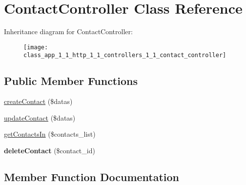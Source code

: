 \hypertarget{class_app_1_1_http_1_1_controllers_1_1_contact_controller}{}\section{Contact\+Controller Class Reference}
\label{class_app_1_1_http_1_1_controllers_1_1_contact_controller}
Inheritance diagram for Contact\+Controller\+:\begin{figure}[H]
\begin{center}
\leavevmode
\texttt{[image: class\_app\_1\_1\_http\_1\_1\_controllers\_1\_1\_contact\_controller]}
\end{center}
\end{figure}
\subsection*{Public Member Functions}
\begin{DoxyCompactItemize}
\item 
\mbox{\hyperlink{class_app_1_1_http_1_1_controllers_1_1_contact_controller_a9c1a9d0c5189af1ee7e9287b1cde286a}{create\+Contact}} (\$datas)
\item 
\mbox{\hyperlink{class_app_1_1_http_1_1_controllers_1_1_contact_controller_a130677ffbe99afed089649cbaf087a96}{update\+Contact}} (\$datas)
\item 
\mbox{\hyperlink{class_app_1_1_http_1_1_controllers_1_1_contact_controller_aa1e18fa592ca6af9570bafcb7ed25dd6}{get\+Contacts\+In}} (\$contacts\+\_\+list)
\item 
\mbox{\label{class_app_1_1_http_1_1_controllers_1_1_contact_controller_a68700d3146da40f57153f6ac05d5d2ac}} 
{\bfseries delete\+Contact} (\$contact\+\_\+id)
\end{DoxyCompactItemize}


\subsection{Member Function Documentation}
\mbox{\label{class_app_1_1_http_1_1_controllers_1_1_contact_controller_a9c1a9d0c5189af1ee7e9287b1cde286a}} 
